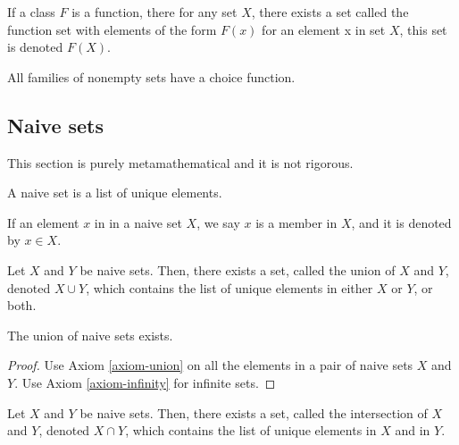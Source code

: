 \begin{definition}
	\label{axiom-schema-replacement}
	If a class $F$ is a function, there for any set $X$, there exists a set called the function set with elements of the form $F(x)$ for an element x in set $X$, this set is denoted $F(X)$.
\end{definition}

\begin{definition}
	\label{axiom-strong-choice}
	All families of nonempty sets have a choice function.
\end{definition}
\subsection{Naive sets}

This section is purely metamathematical and it is not rigorous.

\begin{definition}
	A naive set is a list of unique elements.
\end{definition}

\begin{definition}
	If an element $x$ in in a naive set $X$, we say $x$ is a member in $X$, and it is denoted by $x \in X$.
\end{definition}

\begin{definition}
	Let $X$ and $Y$ be naive sets.
	Then, there exists a set, called the union of $X$ and $Y$, denoted $X \cup Y$, which contains the list of unique elements in either $X$ or $Y$, or both.
\end{definition}

\begin{lemma}
	\label{lemma-union-exists}
	The union of naive sets exists.
\end{lemma}

\begin{proof}
	Use Axiom \ref{axiom-union} on all the elements in a pair of naive sets $X$ and $Y$. Use Axiom \ref{axiom-infinity} for infinite sets.
\end{proof}

\begin{definition}
	Let $X$ and $Y$ be naive sets.
	Then, there exists a set, called the intersection of $X$ and $Y$, denoted $X \cap Y$, which contains the list of unique elements in $X$ and in $Y$. 
\end{definition}

